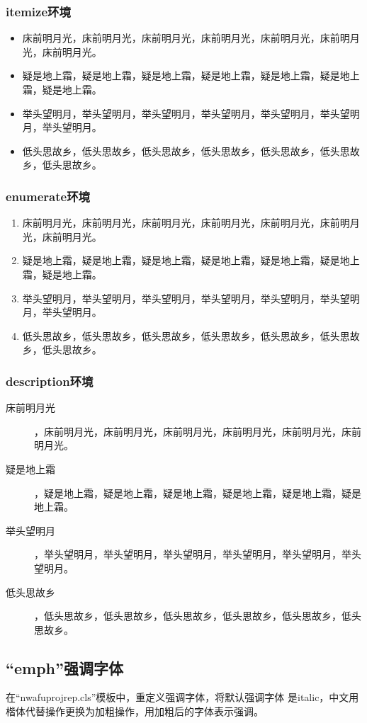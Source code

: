 \documentclass[
  ]{nwafuprojrep}
\begin{document}
\subsubsection{itemize环境}
\begin{itemize}
\item 床前明月光，床前明月光，床前明月光，床前明月光，床前明月光，床前明月光，床前明月光。
\item 疑是地上霜，疑是地上霜，疑是地上霜，疑是地上霜，疑是地上霜，疑是地上霜，疑是地上霜。
\item 举头望明月，举头望明月，举头望明月，举头望明月，举头望明月，举头望明月，举头望明月。
\item 低头思故乡，低头思故乡，低头思故乡，低头思故乡，低头思故乡，低头思故乡，低头思故乡。
\end{itemize}
\subsubsection{enumerate环境}
\begin{enumerate}
\item 床前明月光，床前明月光，床前明月光，床前明月光，床前明月光，床前明月光，床前明月光。
\item 疑是地上霜，疑是地上霜，疑是地上霜，疑是地上霜，疑是地上霜，疑是地上霜，疑是地上霜。
\item 举头望明月，举头望明月，举头望明月，举头望明月，举头望明月，举头望明月，举头望明月。
\item 低头思故乡，低头思故乡，低头思故乡，低头思故乡，低头思故乡，低头思故乡，低头思故乡。
\end{enumerate}
\subsubsection{description环境}
\begin{description}
\item[床前明月光]，床前明月光，床前明月光，床前明月光，床前明月光，床前明月光，床前明月光。
\item[疑是地上霜]，疑是地上霜，疑是地上霜，疑是地上霜，疑是地上霜，疑是地上霜，疑是地上霜。
\item[举头望明月]，举头望明月，举头望明月，举头望明月，举头望明月，举头望明月，举头望明月。
\item[低头思故乡]，低头思故乡，低头思故乡，低头思故乡，低头思故乡，低头思故乡，低头思故乡。
\end{description}

\subsection{\enquote{emph}强调字体}
在\enquote{nwafuprojrep.cls}模板中，重定义强调字体，将默认强调字体
是italic，中文用楷体代替操作更换为加粗操作，用加粗后的字体表示强调。
\end{document}
